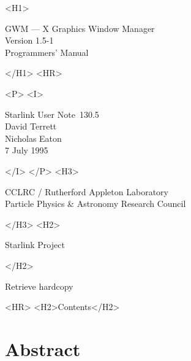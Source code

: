 \documentclass[twoside,11pt]{article}
\newcommand{\stardoccategory}  {Starlink User Note}
\newcommand{\stardocsource}    {sun\stardocnumber}
\newcommand{\stardocnumber}    {130.5}
\newcommand{\stardocauthors}   {David Terrett\\Nicholas Eaton}
\newcommand{\stardocdate}      {7 July 1995}
\newcommand{\stardoctitle}     {GWM --- X Graphics Window Manager}
\newcommand{\stardocversion}   {Version 1.5-1}
\newcommand{\stardocmanual}    {Programmers' Manual}
\newcommand{\htmladdnormallink}[2]{#1}
\newcommand{\htmladdimg}[1]{}
\newcommand{\htmlref}[2]{#1}
\newcommand{\htmladdtonavigation}[1]{}
\newcommand{\xlabel}[1]{}
\renewcommand{\_}{\texttt{\symbol{95}}}
\begin{document}
\begin{htmlonly}
   \xlabel{}
   \begin{rawhtml} <H1> \end{rawhtml}
      \stardoctitle\\
      \stardocversion\\
      \stardocmanual
   \begin{rawhtml} </H1> <HR> \end{rawhtml}


   \begin{rawhtml} <P> <I> \end{rawhtml}
   \stardoccategory\ \stardocnumber \\
   \stardocauthors \\
   \stardocdate
   \begin{rawhtml} </I> </P> <H3> \end{rawhtml}
      \htmladdnormallink{CCLRC / Rutherford Appleton Laboratory}
                        {http://www.cclrc.ac.uk} \\
      \htmladdnormallink{Particle Physics \& Astronomy Research Council}
                        {http://www.pparc.ac.uk} \\
   \begin{rawhtml} </H3> <H2> \end{rawhtml}
      \htmladdnormallink{Starlink Project}{http://www.starlink.ac.uk/}
   \begin{rawhtml} </H2> \end{rawhtml}
   \htmladdnormallink{\htmladdimg{source.gif} Retrieve hardcopy}
      {http://www.starlink.ac.uk/cgi-bin/hcserver?\stardocsource}\\

  \label{stardoccontents}
  \begin{rawhtml}
    <HR>
    <H2>Contents</H2>
  \end{rawhtml}
  \htmladdtonavigation{\htmlref{\htmladdimg{contents_motif.gif}}
        {stardoccontents}}

  \section{\xlabel{abstract}Abstract}
\end{htmlonly}
\end{document}
